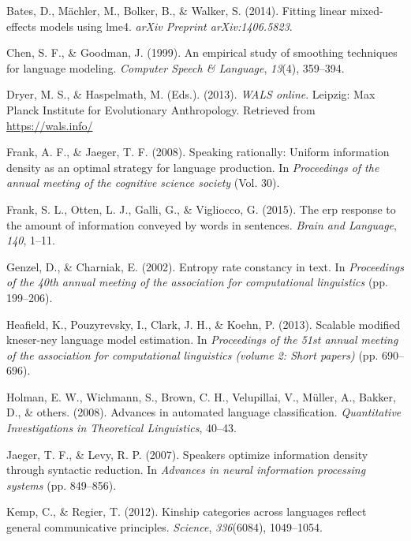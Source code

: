 \documentclass[man,floatsintext]{apa6}
\begin{document}
\leavevmode\hypertarget{ref-bates2014}{}%
Bates, D., Mächler, M., Bolker, B., \& Walker, S. (2014). Fitting linear mixed-effects models using lme4. \emph{arXiv Preprint arXiv:1406.5823}.

\leavevmode\hypertarget{ref-chen1999empirical}{}%
Chen, S. F., \& Goodman, J. (1999). An empirical study of smoothing techniques for language modeling. \emph{Computer Speech \& Language}, \emph{13}(4), 359--394.

\leavevmode\hypertarget{ref-wals}{}%
Dryer, M. S., \& Haspelmath, M. (Eds.). (2013). \emph{WALS online}. Leipzig: Max Planck Institute for Evolutionary Anthropology. Retrieved from \url{https://wals.info/}

\leavevmode\hypertarget{ref-frank2008}{}%
Frank, A. F., \& Jaeger, T. F. (2008). Speaking rationally: Uniform information density as an optimal strategy for language production. In \emph{Proceedings of the annual meeting of the cognitive science society} (Vol. 30).

\leavevmode\hypertarget{ref-frank2015}{}%
Frank, S. L., Otten, L. J., Galli, G., \& Vigliocco, G. (2015). The erp response to the amount of information conveyed by words in sentences. \emph{Brain and Language}, \emph{140}, 1--11.

\leavevmode\hypertarget{ref-genzel2002}{}%
Genzel, D., \& Charniak, E. (2002). Entropy rate constancy in text. In \emph{Proceedings of the 40th annual meeting of the association for computational linguistics} (pp. 199--206).

\leavevmode\hypertarget{ref-heafield2013scalable}{}%
Heafield, K., Pouzyrevsky, I., Clark, J. H., \& Koehn, P. (2013). Scalable modified kneser-ney language model estimation. In \emph{Proceedings of the 51st annual meeting of the association for computational linguistics (volume 2: Short papers)} (pp. 690--696).

\leavevmode\hypertarget{ref-holman2008}{}%
Holman, E. W., Wichmann, S., Brown, C. H., Velupillai, V., Müller, A., Bakker, D., \& others. (2008). Advances in automated language classification. \emph{Quantitative Investigations in Theoretical Linguistics}, 40--43.

\leavevmode\hypertarget{ref-jaeger2007}{}%
Jaeger, T. F., \& Levy, R. P. (2007). Speakers optimize information density through syntactic reduction. In \emph{Advances in neural information processing systems} (pp. 849--856).

\leavevmode\hypertarget{ref-kemp2012kinship}{}%
Kemp, C., \& Regier, T. (2012). Kinship categories across languages reflect general communicative principles. \emph{Science}, \emph{336}(6084), 1049--1054.
\end{document}
